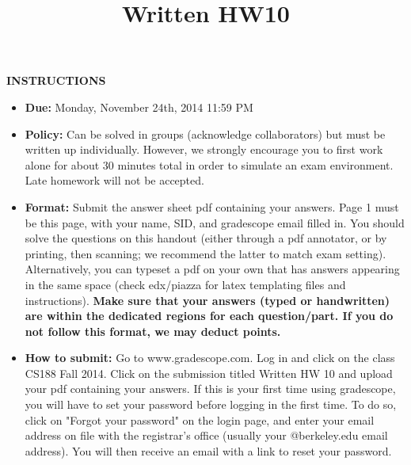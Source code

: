 \documentclass[twoside]{article}
\title{Written HW10}
\begin{document}
\thispagestyle{empty}
\maketitle


\smallskip
\smallskip
\textbf{INSTRUCTIONS}

\begin{itemize}
\item \textbf{Due:} Monday, November 24th, 2014 11:59 PM
\item \textbf{Policy:} Can be solved in groups (acknowledge collaborators) but must
be written up individually. However,
we strongly encourage you to first work alone for about 30 minutes total in order to simulate an exam environment.  Late homework
will not be accepted.
\item \textbf{Format:}  Submit the answer sheet pdf containing your answers. Page 1
must be this page, with your name,
SID, and gradescope email filled in.
You should solve the questions on this handout (either through a pdf annotator, or by printing, then scanning; we recommend the latter to match exam setting). Alternatively, you can typeset a pdf on your own that has answers appearing in the same space (check edx/piazza for latex templating files and instructions).
\textbf{Make sure that your answers (typed or handwritten) are within the
dedicated regions for each question/part.  If you do not follow this format, we may deduct points.}

\item \textbf{How to submit:}  Go to www.gradescope.com. Log in and click on the
class CS188 Fall 2014. Click
on the submission titled Written HW 10 and upload your pdf containing your answers. If this is your first time using
gradescope, you will have to set your password before logging in the
first time.  To do so, click on "Forgot your password" on the login
page, and enter your email address on file with the registrar's office
(usually your @berkeley.edu email address). You will then receive an
email with a link to reset your password.

\end{itemize}
\end{document}
